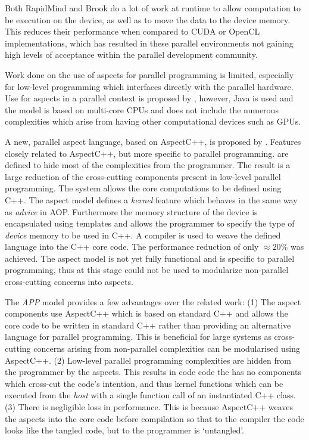 \documentclass{sig-alternate-05-2015}
\begin{document}
Both RapidMind and Brook do a lot of work at runtime to allow computation to be
execution on the device, as well as to move the data to the device memory. This
reduces their performance when compared to CUDA or OpenCL implementations, which
has resulted in these parallel environments not gaining high levels of acceptance 
within the parallel development community.

Work done on the use of aspects for parallel programming is limited, especially
for low-level programming which interfaces directly with the parallel hardware.
Use for aspects in a parallel context is proposed by \cite{jaspect},
however, Java is used and the model is based on multi-core CPUs and does not include the
numerous complexities which arise from having other computational devices such
as GPUs.

A new, parallel aspect language, based on AspectC++, is proposed by
\cite{aopstream}. Features closely related to AspectC++, but more specific to
parallel programming. are defined to hide most of the complexities from the
programmer. The result is a large  reduction of the cross-cutting components
present in low-level parallel programming. The system allows the core computations 
to be defined using C++. The aspect model defines a \textit{kernel} feature
which behaves in the same way as \textit{advice} in AOP. Furthermore the memory
structure of the device is encapsulated using templates and allows the
programmer to specify the type of \textit{device} memory to be used in C++. A
compiler is used to weave the defined language into the C++ core code. The
performance reduction of only $\approx$20$\%$ was achieved. The aspect model is
not yet fully functional and is specific to parallel programming, thus at this
stage could not be used to modularize non-parallel cross-cutting concerns into
aspects.

The \textit{APP} model provides a few advantages over the related work:
(1) The aspect components use AspectC++ which is based on standard
C++ and allows the core code to be written in standard C++ rather than providing
an alternative language for parallel programming. This is beneficial for large
systems as cross-cutting concerns arising from non-parallel complexities can be
modularised using AspectC++. (2) Low-level parallel programming complexities are 
hidden from the programmer by the aspects. This results in code code the has no
components which cross-cut the code's intention, and thus kernel functions which
can be executed from the \textit{host} with a single function call of an
instantiated C++ class. (3) There is negligible loss in performance. This is because 
AspectC++ weaves the aspects into the core code before compilation so that to
the compiler the code looks like the tangled code, but to the programmer is
`untangled'.
\end{document}
